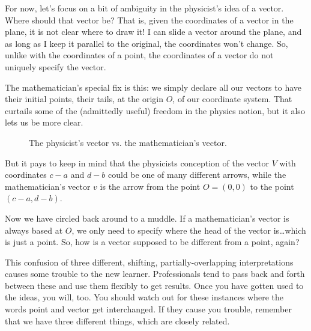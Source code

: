 \documentclass[00-livre-main.tex]{subfiles}
\begin{document}
For now, let's focus on a bit of ambiguity in the physicist's idea of a vector.
Where should that vector be?
That is, given the coordinates of a vector in the plane, it is not clear where to draw it!
I can slide a vector around the plane, and as long as I keep it parallel to the original, the coordinates won't change.
So, unlike with the coordinates of a point, the coordinates of a vector do not uniquely specify the vector.

The mathematician's special fix is this: we simply declare all our vectors to have their initial points, their tails, at the origin $O$, of our coordinate system.
That curtails some of the (admittedly useful) freedom in the physics notion, but it also lets us be more clear.

\begin{figure}[h]
\centering
{}
\caption{The physicist's vector vs. the mathematician's vector.}
\end{figure}

But it pays to keep in mind that the physicists conception of the vector $V$ with coordinates $c-a$ and $d-b$ could be one of many different arrows, while the mathematician's vector $v$ is the arrow from the point $O = (0,0)$ to the point $(c-a, d-b)$.

Now we have circled back around to a muddle. If a mathematician's vector is always based at $O$, we only need to specify where the head of the vector is\dots which is just a point. So, how is a vector supposed to be different from a point, again?

This confusion of three different, shifting, partially-overlapping interpretations causes some trouble to the new learner.
Professionals tend to pass back and forth between these and use them flexibly to get results.
Once you have gotten used to the ideas, you will, too.
You should watch out for these instances where the words point and vector get interchanged.
If they cause you trouble, remember that we have three different things, which are closely related.
\end{document}
